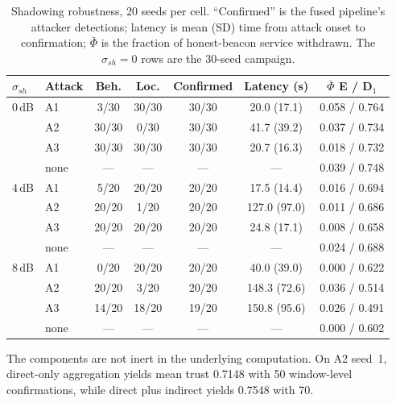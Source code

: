 \begin{table}[!t]
\caption{Shadowing robustness, 20 seeds per cell. ``Confirmed'' is the
fused pipeline's attacker detections; latency is mean (SD) time from attack
onset to confirmation; $\bar\Phi$ is the fraction of honest-beacon service
withdrawn. The $\sigma_{sh} = 0$ rows are the 30-seed campaign.}
\label{tab:shadow}
\centering
\small
\setlength{\tabcolsep}{4pt}
\begin{tabular}{@{}llccccc@{}}
\hline
$\sigma_{sh}$ & Attack & Beh. & Loc. & Confirmed & Latency (s) & $\bar\Phi$ E / D$_1$ \\
\hline
0\,dB & A1 & 3/30 & 30/30 & 30/30 & 20.0 (17.1) & 0.058 / 0.764 \\
      & A2 & 30/30 & 0/30 & 30/30 & 41.7 (39.2) & 0.037 / 0.734 \\
      & A3 & 30/30 & 30/30 & 30/30 & 20.7 (16.3) & 0.018 / 0.732 \\
      & none & --- & --- & --- & --- & 0.039 / 0.748 \\
4\,dB & A1 & 5/20 & 20/20 & 20/20 & 17.5 (14.4) & 0.016 / 0.694 \\
      & A2 & 20/20 & 1/20 & 20/20 & 127.0 (97.0) & 0.011 / 0.686 \\
      & A3 & 20/20 & 20/20 & 20/20 & 24.8 (17.1) & 0.008 / 0.658 \\
      & none & --- & --- & --- & --- & 0.024 / 0.688 \\
8\,dB & A1 & 0/20 & 20/20 & 20/20 & 40.0 (39.0) & 0.000 / 0.622 \\
      & A2 & 20/20 & 3/20 & 20/20 & 148.3 (72.6) & 0.036 / 0.514 \\
      & A3 & 14/20 & 18/20 & 19/20 & 150.8 (95.6) & 0.026 / 0.491 \\
      & none & --- & --- & --- & --- & 0.000 / 0.602 \\
\hline
\end{tabular}
\end{table}


The components are not inert in the underlying computation. On A2 seed~1,
direct-only aggregation yields mean trust 0.7148 with 50 window-level
confirmations, while direct plus indirect yields 0.7548 with 70.


